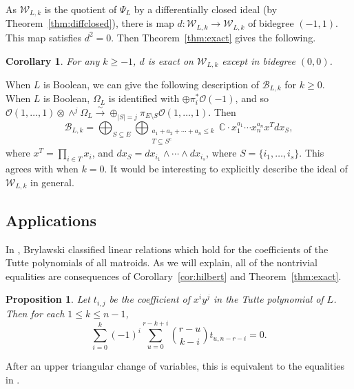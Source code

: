\documentclass{amsart}
\newtheorem{proposition}[theorem]{Proposition}
\newtheorem{corollary}[theorem]{Corollary}
\theoremstyle{definition}
\begin{document}
As $\mathcal{W}_{L, k}$ is the quotient of $\Psi_L$ by a differentially closed ideal (by Theorem~\ref{thm:diffclosed}), there is map $d \colon \mathcal{W}_{L, k} \to \mathcal{W}_{L, k}$ of bidegree $(-1, 1)$. This map satisfies $d^2 = 0$. Then Theorem~\ref{thm:exact} gives the following. 

\begin{corollary}
For any $k \ge -1$, $d$ is exact on $\mathcal{W}_{L, k}$ except in bidegree $(0,0)$. 
\end{corollary}

When $L$ is Boolean, we can give the following description of $\mathcal{B}_{L, k}$ for $k \ge 0$. When $L$ is Boolean, $\Omega_L$ is identified with  $\oplus \pi_i^* \mathcal{O}(-1)$, and so $\mathcal{O}(1, \dotsc, 1) \otimes \wedge^j \Omega_L \stackrel{\sim}{\to} \oplus_{|S| = j} \pi_{E \setminus S} \mathcal{O}(1, \dotsc, 1)$. Then
\begin{equation}\label{eq:booleanposk}
\mathcal{B}_{L, k} = \bigoplus_{S \subseteq E} \bigoplus_{\substack{a_1 + a_2 + \dotsb + a_n \le k \\ T \subseteq S^c}} \mathbb{C} \cdot x_1^{a_1} \dotsb x_n^{a_n} x^T dx_S,
\end{equation}
where $x^T = \prod_{i \in T} x_i$, and $dx_S = dx_{i_1} \wedge \dotsb 
\wedge dx_{i_s}$, where $S = \{i_1, \dotsc, i_s\}$. This agrees with \cite[Lemma 3.6]{Superspace} when $k=0$. It would be interesting to explicitly describe the ideal of $\mathcal{W}_{L, k}$ in general. 


\subsection{Applications}

In \cite[Theorem 6.6]{BrylawskiEquality}, Brylawski classified linear relations which hold for the coefficients of the Tutte polynomials of all matroids. As we will explain, all of the nontrivial equalities are consequences of Corollary~\ref{cor:hilbert} and Theorem~\ref{thm:exact}. 

\begin{proposition}\label{prop:brylawksiequalities}
Let $t_{i,j}$ be the coefficient of $x^iy^j$ in the Tutte polynomial of $L$. Then for each $1 \le k \le n-1$,
$$\sum_{i=0}^{k} (-1)^{i} \sum_{u=0}^{r-k+i} \binom{r-u}{k-i} t_{u, n-r-i} = 0.$$
\end{proposition}

After an upper triangular change of variables, this is equivalent to the equalities in \cite[Theorem 6.6]{BrylawskiEquality}. 
\end{document}
